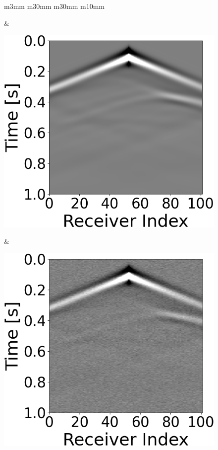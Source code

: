 \begin{figure}[t]
    \centering
    \begin{tabular}{m{3mm} m{30mm} m{30mm} m{10mm}}
        \begin{minipage}[b]{\linewidth}\end{minipage} &

        \begin{minipage}[b]{\linewidth}
            \centering
            \includegraphics[width=\linewidth]{public/seismic_data}
            \vspace{-7mm}
            \caption*{}
            \vspace{1mm}
        \end{minipage} &
        \begin{minipage}[b]{\linewidth}
            \centering
            \includegraphics[width=\linewidth]{public/seismic_data_noisy}

\end{minipage}
\end{tabular}
\end{figure}
